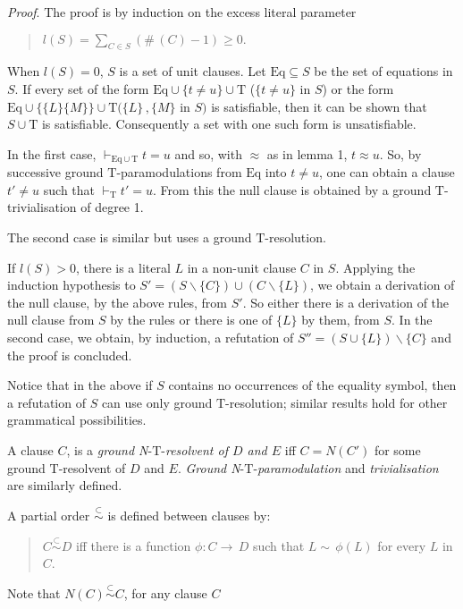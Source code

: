 \documentclass[letterpaper]{report}
\begin{document}
\noindent
\emph{Proof}. The proof is by induction on the excess literal parameter
\begin{quote}
$\displaystyle l(S)=\sum_{C\in S}(\#\,(C)-1) \geqslant 0.$
\end{quote}

When $l(S)=0$, $S$ is a set of unit clauses. Let
$\mathrm{Eq}\subseteq S$ be the set of equations in $S$. If every set of
the form $\mathrm{Eq}\cup\{t\neq u\}\cup\mathrm{T}$ ($\{t\neq u\}$
in $S$) or the form
$\mathrm{Eq}\cup\{\{L\}\{M\}\}\cup\mathrm{T} (\{L\}\, , \{M\}$ in
$S)$ is satisfiable, then it can be shown that $S\cup\mathrm{T}$ is
satisfiable. Consequently a set with one such form is unsatisfiable.

In the first case, $\vdash_{\mathrm{Eq}\cup\mathrm{T}} t=u$ and so,
with $\approx$ as in lemma 1, $t\approx u$. So, by successive ground
$\mathrm{T}$-paramodulations from $\textrm{Eq}$ into $t\neq u$,
one can obtain a clause $t'\neq u$ such that
$\vdash_{\mathrm{T}}$$t'=u$. From this the null clause is
obtained by a ground $\mathrm{T}$-trivialisation of degree 1.

The second case is similar but uses a ground $\mathrm{T}$-resolution.

If $l(S)>0$, there is a literal $L$ in a non-unit clause $C$
in $S$. Applying the induction hypothesis to
$S'{=}(S\backslash\{C\})\cup(C\backslash\{L\})$, we obtain a
derivation of the null clause, by the above rules, from $S'$.
So either there is a derivation of the null clause from $S$ by the
rules or there is one of $\{L\}$ by them, from $S$. In the second
case, we obtain, by induction, a refutation of
$S''{=}(S\cup\{L\})\backslash\{C\}$ and the proof is
concluded.

Notice that in the above if $S$ contains no occurrences of the
equality symbol, then a refutation of $S$ can use only ground
$\mathrm{T}$-resolution; similar results hold for other grammatical
possibilities.

A clause $C$, is a \emph{ground N}-$\mathrm{T}$-\emph{resolvent of
	$D$ and $E$} iff $C{=}N(C')$ for some ground
$\mathrm{T}$-resolvent of $D$ and $E$. \emph{Ground
	N}-$\mathrm{T}$-\emph{paramodulation} and \emph{trivialisation} are
similarly defined.

A partial order $\stackrel{{\subset}}{{\sim}}$ is defined between clauses
by:
\begin{quote}
$C\stackrel{{\subset}}{{\sim}}D$ iff there is a function
$\phi \colon C{\rightarrow}\,D$ such that $L{\sim}\,\phi(L)$ for
every $L$ in $C$.
\end{quote}
Note that $N(C)\stackrel{{\subset}}{{\sim}}C$, for any clause $C$
\end{document}
